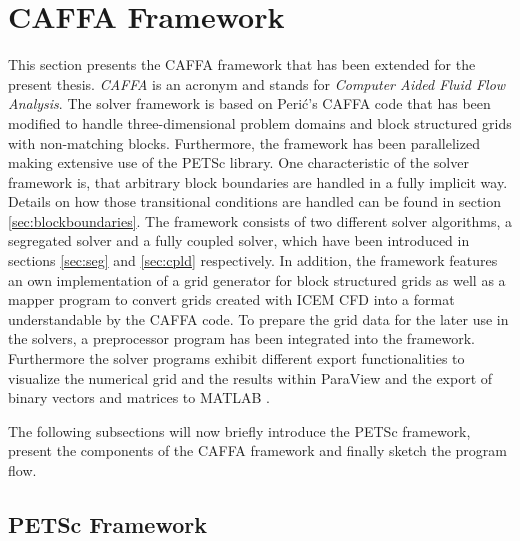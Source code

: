 \section{CAFFA Framework}

This section presents the CAFFA framework that has been extended for the present thesis. \emph{CAFFA} is an acronym and stands for \emph{Computer Aided Fluid Flow Analysis}. The solver framework is based on Peri\'c's CAFFA code \cite{caffawebpage,caffa3dwebpage} that has been modified to handle three-dimensional problem domains and block structured grids with non-matching blocks. Furthermore, the framework has been parallelized making extensive use of the PETSc library. One characteristic of the solver framework is, that arbitrary block boundaries are handled in a fully implicit way. Details on how those transitional conditions are handled can be found in section \ref{sec:blockboundaries}. The framework consists of two different solver algorithms, a segregated solver and a fully coupled solver, which have been introduced in sections \ref{sec:seg} and \ref{sec:cpld} respectively. In addition, the framework features an own implementation of a grid generator for block structured grids as well as a mapper program to convert grids created with ICEM CFD \cite{icemdfd} into a format understandable by the CAFFA code. To prepare the grid data for the later use in the solvers, a preprocessor program has been integrated into the framework. Furthermore the solver programs exhibit different export functionalities to visualize the numerical grid and the results within ParaView \cite{paraview} and the export of binary vectors and matrices to MATLAB \textregistered \cite{matlab}.

The following subsections will now briefly introduce the PETSc framework, present the components of the CAFFA framework and finally sketch the program flow.

\subsection{PETSc Framework}

